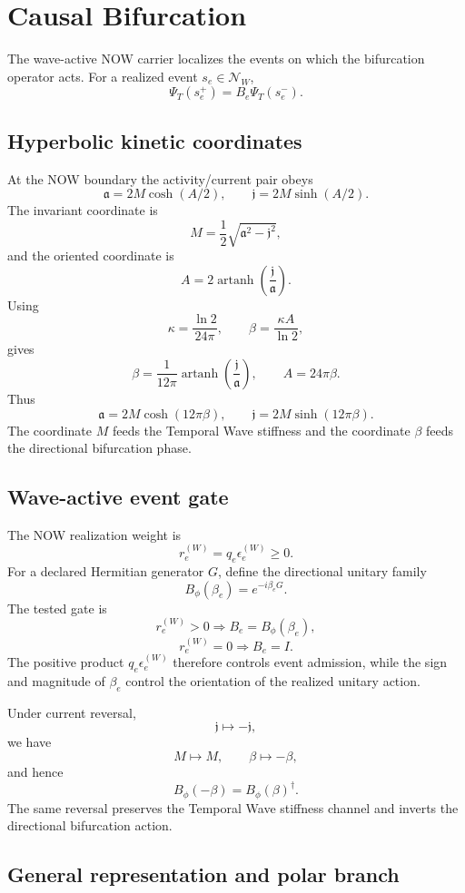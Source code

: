 \chapter{Causal Bifurcation}

The wave-active NOW carrier localizes the events on which the bifurcation operator acts.  For a realized event $s_e\in\mathcal N_W$,
\[
\Psi_T(s_e^+)=B_e\Psi_T(s_e^-).
\]

\section{Hyperbolic kinetic coordinates}

At the NOW boundary the activity/current pair obeys
\[
\mathfrak a=2M\cosh(A/2),
\qquad
\mathfrak j=2M\sinh(A/2).
\]
The invariant coordinate is
\[
\boxed{
M=\frac12\sqrt{\mathfrak a^2-\mathfrak j^2},
}
\]
and the oriented coordinate is
\[
A=2\operatorname{artanh}\!\left(\frac{\mathfrak j}{\mathfrak a}\right).
\]
Using
\[
\kappa=\frac{\ln2}{24\pi},
\qquad
\beta=\frac{\kappa A}{\ln2},
\]
gives
\[
\boxed{
\beta=\frac{1}{12\pi}
\operatorname{artanh}\!\left(\frac{\mathfrak j}{\mathfrak a}\right),
\qquad
A=24\pi\beta.
}
\]
Thus
\[
\boxed{
\mathfrak a=2M\cosh(12\pi\beta),
\qquad
\mathfrak j=2M\sinh(12\pi\beta).
}
\]
The coordinate $M$ feeds the Temporal Wave stiffness and the coordinate $\beta$ feeds the directional bifurcation phase.

\section{Wave-active event gate}

The NOW realization weight is
\[
r_e^{(W)}=q_e\epsilon_e^{(W)}\ge0.
\]
For a declared Hermitian generator $G$, define the directional unitary family
\[
B_\phi(\beta_e)=e^{-i\beta_eG}.
\]
The tested gate is
\[
\boxed{
r_e^{(W)}>0\Rightarrow B_e=B_\phi(\beta_e),}
\]
\[
\boxed{
r_e^{(W)}=0\Rightarrow B_e=I.}
\]
The positive product $q_e\epsilon_e^{(W)}$ therefore controls event admission, while the sign and magnitude of $\beta_e$ control the orientation of the realized unitary action.

Under current reversal,
\[
\mathfrak j\mapsto-\mathfrak j,
\]
we have
\[
M\mapsto M,
\qquad
\beta\mapsto-\beta,
\]
and hence
\[
\boxed{
B_\phi(-\beta)=B_\phi(\beta)^\dagger.
}
\]
The same reversal preserves the Temporal Wave stiffness channel and inverts the directional bifurcation action.

\section{General representation and polar branch}

